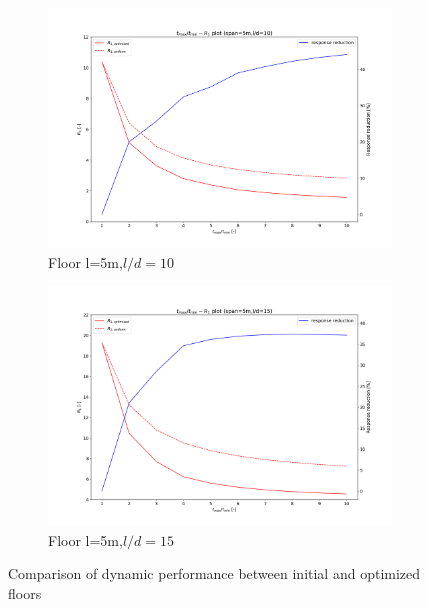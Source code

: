 \begin{figure}[H]
\begin{subfigure}[b]{.9\textwidth}
  \centering
  \includegraphics[width=.99\linewidth]{images/gamma_R1_l2d10}
  \caption{Floor l=5m,$l/d=10$}
\end{subfigure}

\begin{subfigure}[b]{.9\textwidth}
  \centering
  \includegraphics[width=.99\linewidth]{images/gamma_R1_l2d15}
  \caption{Floor l=5m,$l/d=15$}
\end{subfigure}

\caption{Comparison of dynamic performance between initial and optimized floors}
\label{fig:gamma_R1_opt}
\end{figure}

